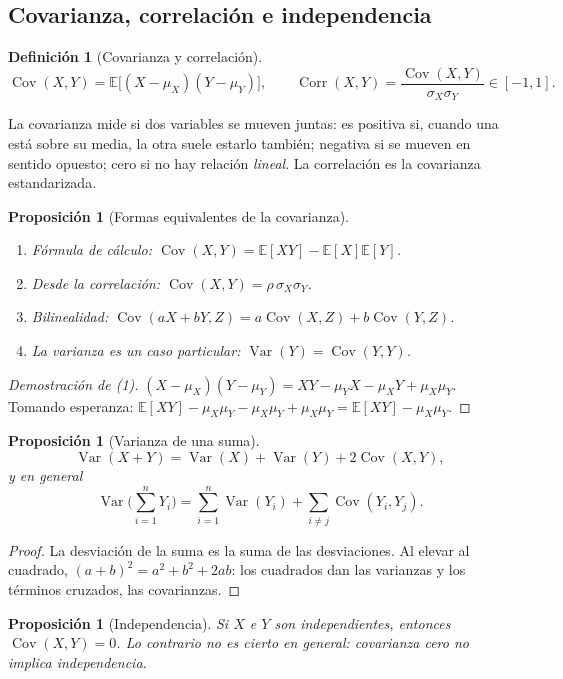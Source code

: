 \documentclass[11pt,a4paper]{article}
\theoremstyle{plain}
\newtheorem{proposicion}[teorema]{Proposición}
\theoremstyle{definition}
\newtheorem{definicion}[teorema]{Definición}
\theoremstyle{remark}
\newcommand{\E}{\mathbb{E}}
\DeclareMathOperator{\Var}{Var}
\DeclareMathOperator{\Cov}{Cov}
\DeclareMathOperator{\Corr}{Corr}
\begin{document}
\subsection{Covarianza, correlación e independencia}

\begin{definicion}[Covarianza y correlación]\label{def:cov}
\[
\Cov(X,Y)=\E\big[(X-\mu_X)(Y-\mu_Y)\big],\qquad
\Corr(X,Y)=\frac{\Cov(X,Y)}{\sigma_X\sigma_Y}\in[-1,1].
\]
\end{definicion}

La covarianza mide si dos variables se mueven juntas: es positiva si, cuando una está sobre
su media, la otra suele estarlo también; negativa si se mueven en sentido opuesto; cero si no
hay relación \emph{lineal}. La correlación es la covarianza estandarizada.

\begin{proposicion}[Formas equivalentes de la covarianza]\label{prop:covforms}\leavevmode
\begin{enumerate}
  \item Fórmula de cálculo: $\Cov(X,Y)=\E[XY]-\E[X]\E[Y]$.
  \item Desde la correlación: $\Cov(X,Y)=\rho\,\sigma_X\sigma_Y$.
  \item Bilinealidad: $\Cov(aX+bY,Z)=a\Cov(X,Z)+b\Cov(Y,Z)$.
  \item La varianza es un caso particular: $\Var(Y)=\Cov(Y,Y)$.
\end{enumerate}
\end{proposicion}
\begin{proof}[Demostración de (1)]
$(X-\mu_X)(Y-\mu_Y)=XY-\mu_YX-\mu_XY+\mu_X\mu_Y$. Tomando esperanza:
$\E[XY]-\mu_X\mu_Y-\mu_X\mu_Y+\mu_X\mu_Y=\E[XY]-\mu_X\mu_Y$.
\end{proof}

\begin{proposicion}[Varianza de una suma]\label{prop:varsuma}
\[
\Var(X+Y)=\Var(X)+\Var(Y)+2\Cov(X,Y),
\]
y en general
\[
\Var\Big(\sum_{i=1}^n Y_i\Big)=\sum_{i=1}^n\Var(Y_i)+\sum_{i\neq j}\Cov(Y_i,Y_j).
\]
\end{proposicion}
\begin{proof}
La desviación de la suma es la suma de las desviaciones. Al elevar al cuadrado,
$(a+b)^2=a^2+b^2+2ab$: los cuadrados dan las varianzas y los términos cruzados, las
covarianzas.
\end{proof}

\begin{proposicion}[Independencia]\label{prop:indep}
Si $X$ e $Y$ son independientes, entonces $\Cov(X,Y)=0$. Lo contrario no es cierto en general:
covarianza cero no implica independencia.
\end{proposicion}
\end{document}
